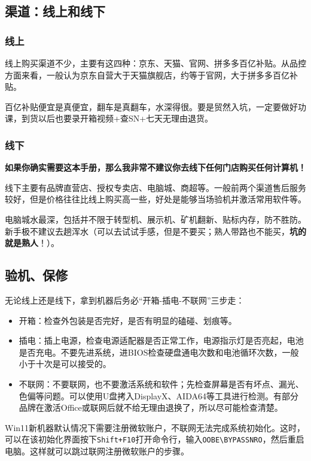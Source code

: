 \documentclass[../main.tex]{subfiles}
\begin{document}
\subsection{渠道：线上和线下}

\subsubsection{线上}

线上购买渠道不少，主要有这四种：京东、天猫、官网、拼多多百亿补贴。从品控方面来看，一般认为京东自营大于天猫旗舰店，约等于官网，大于拼多多百亿补贴。

百亿补贴便宜是真便宜，翻车是真翻车，水深得很。要是贸然入坑，一定要做好功课，到货以后也要录开箱视频+查SN+七天无理由退货。

\subsubsection{线下}

\textbf{如果你确实需要这本手册，那么我非常不建议你去线下任何门店购买任何计算机！}

线下主要有品牌直营店、授权专卖店、电脑城、商超等。一般前两个渠道售后服务较好，但是价格往往比线上购买高一些，好处是能够当场验机并激活常用软件等。

电脑城水最深，包括并不限于转型机、展示机、矿机翻新、贴标内存，防不胜防。新手极不建议去趟浑水（可以去试试手感，但是不要买；熟人带路也不能买，\textbf{坑的就是熟人}！）。

\subsection{验机、保修}

无论线上还是线下，拿到机器后务必“开箱-插电-不联网”三步走：
\begin{itemize}
  \item 开箱：检查外包装是否完好，是否有明显的磕碰、划痕等。
  \item 插电：插上电源，检查电源适配器是否正常工作，电源指示灯是否亮起，电池是否充电。不要先进系统，进BIOS检查硬盘通电次数和电池循环次数，一般小于十次是可以接受的。
  \item 不联网：不要联网，也不要激活系统和软件；先检查屏幕是否有坏点、漏光、色偏等问题。可以使用U盘拷入DisplayX、AIDA64等工具进行检测。有部分品牌在激活Office或联网后就不给无理由退换了，所以尽可能检查清楚。
\end{itemize}

\begin{caution}
  Win11新机器默认情况下需要注册微软账户，不联网无法完成系统初始化。这时，可以在该初始化界面按下\texttt{Shift+F10}打开命令行，输入\texttt{OOBE\textbackslash BYPASSNRO}，然后重启电脑。这样就可以跳过联网注册微软账户的步骤。
\end{caution}
\end{document}
